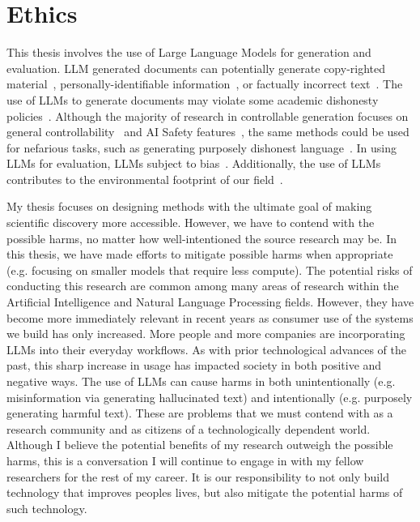\section{Ethics}
This thesis involves the use of Large Language Models for generation and evaluation. LLM generated documents can potentially generate copy-righted material~\cite{carlini21extracting}, personally-identifiable information~\cite{Lukas2023AnalyzingLO}, or factually incorrect text~\cite{Manakul2023SelfCheckGPTZB}. The use of LLMs to generate documents may violate some academic dishonesty policies~\cite{Zdravkova2023IntegrationOL}.
Although the majority of research in controllable generation focuses on general controllability~\cite{Keskar2019CTRLAC,Chen2024BenchmarkingLL,yang-klein-2021-fudge} and AI Safety features~\cite{zou2025representationengineeringtopdownapproach,rimsky-etal-2024-steering}, the same methods could be used for nefarious tasks, such as generating purposely dishonest language~\cite{BARMAN2024100545}. In using LLMs for evaluation, LLMs subject to bias~\cite{Venkit2024AnAO,Stureborg2024LargeLM}. Additionally, the use of LLMs contributes to the environmental footprint of our field~\cite{Schwartz2019GreenA}.  

My thesis focuses on designing methods with the ultimate goal of making scientific discovery more accessible. However, we have to contend with the possible harms, no matter how well-intentioned the source research may be. In this thesis, we have made efforts to mitigate possible harms when appropriate (e.g. focusing on smaller models that require less compute). The potential risks of conducting this research are common among many areas of research within the Artificial Intelligence and Natural Language Processing fields. However, they have become more immediately relevant in recent years as consumer use of the systems we build has only increased. More people and more companies are incorporating LLMs into their everyday workflows. As with prior technological advances of the past, this sharp increase in usage has impacted society in both positive and negative ways. The use of LLMs can cause harms in both unintentionally (e.g. misinformation via generating hallucinated text) and intentionally (e.g. purposely generating harmful text). These are problems that we must contend with as a research community and as citizens of a technologically dependent world. Although I believe the potential benefits of my research outweigh the possible harms, this is a conversation I will continue to engage in with my fellow researchers for the rest of my career. It is our responsibility to not only build technology that improves peoples lives, but also mitigate the potential harms of such technology. 


